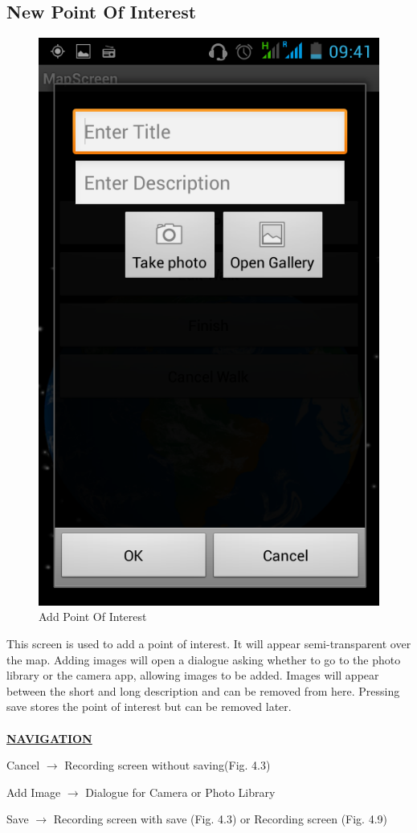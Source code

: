 \documentclass[12pt]{article}
\begin{document}
\subsection{New Point Of Interest}
\begin{figure}[htp]
\centering
\includegraphics[scale=0.4]{Project_Plan/android/add_poi.png}
\caption{Add Point Of Interest}
\label{Add Point Of Interest}
\end{figure}
\par{This screen is used to add a point of interest. It will appear semi-transparent over the map. Adding images will open a dialogue asking whether to go to the photo library or the camera app, allowing images to be added. Images will appear between the short and long description and can be removed from here. Pressing save stores the point of interest but can be removed later. \\ \\}
\textbf{\uline{NAVIGATION}}
\par{Cancel $\rightarrow$ Recording screen without saving(Fig. 4.3)}
\par{Add Image $\rightarrow$ Dialogue for Camera or Photo Library}
\par{Save $\rightarrow$ Recording screen with save (Fig. 4.3) or Recording screen (Fig. 4.9)}
\end{document}
